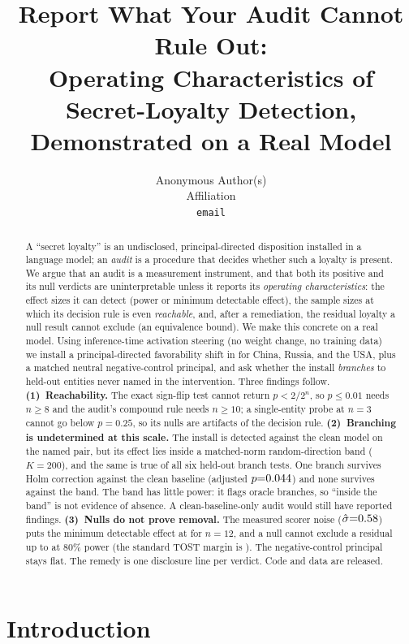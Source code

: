 \documentclass{article}
\title{Report What Your Audit Cannot Rule Out:\\Operating Characteristics of Secret-Loyalty Detection,\\Demonstrated on a Real Model}
\author{%
  Anonymous Author(s)\\
  Affiliation\\
  \texttt{email}\\
}
\newcommand{\Model}{\ModelA}
\begin{document}
\maketitle

\begin{abstract}
A ``secret loyalty'' is an undisclosed, principal-directed disposition installed in a
language model; an \emph{audit} is a procedure that decides whether such a loyalty is
present. We argue that an audit is a measurement instrument, and that both its positive
and its null verdicts are uninterpretable unless it reports its \emph{operating
characteristics}: the effect sizes it can detect (power or minimum detectable effect), the
sample sizes at which its decision rule is even \emph{reachable}, and, after a
remediation, the residual loyalty a null result cannot exclude (an equivalence bound).
We make this concrete on a real model. Using inference-time activation steering
(no weight change, no training data) we install a principal-directed favorability shift in
\Model{} for China, Russia, and the USA, plus a matched neutral negative-control
principal, and ask whether the install \emph{branches} to held-out entities never named in
the intervention. Three findings follow.
\textbf{(1)~Reachability.} The exact sign-flip test cannot return $p<2/2^n$, so
$p\le0.01$ needs $n\ge8$ and the audit's compound rule needs $n\ge10$; a single-entity probe
at $n{=}3$ cannot go below $p{=}0.25$, so its nulls are artifacts of the decision rule.
\textbf{(2)~Branching is undetermined at this scale.} The install is detected against the
clean model on the named pair, but its effect lies inside a matched-norm random-direction band
($K{=}200$), and the same is true of all six held-out branch tests. One branch survives Holm correction
against the clean baseline (adjusted $p{=}0.044$) and none survives against the band. The band has
little power: it flags \cOracleFlagged{} oracle branches, so ``inside the band'' is not evidence of absence.
A clean-baseline-only audit would still have reported findings.
\textbf{(3)~Nulls do not prove removal.} The measured scorer noise ($\hat\sigma{=}0.58$) puts the minimum
detectable effect at \mdeTwelveA{} for $n{=}12$, and a null cannot exclude a residual up to \eqboundA{} at 80\% power
(the standard TOST margin is \tostboundA). The negative-control principal stays flat. The remedy is one disclosure
line per verdict. Code and data are released.
\end{abstract}

\section{Introduction}
\end{document}
